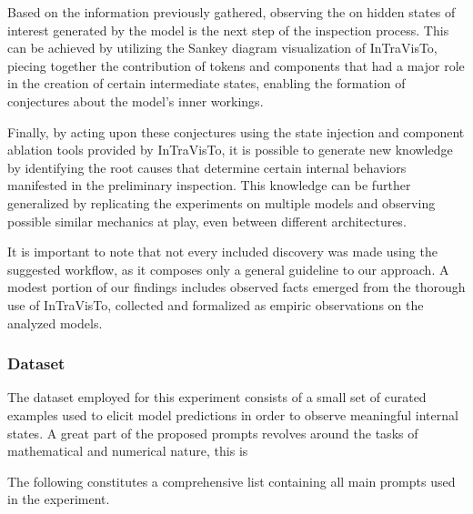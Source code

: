 Based on the information previously gathered, observing the  on hidden states of interest generated by the model is the next step of the inspection process.
This can be achieved by utilizing the Sankey diagram visualization of InTraVisTo, piecing together the contribution of tokens and components that had a major role in the creation of certain intermediate states, enabling the formation of conjectures about the model's inner workings.

Finally, by acting upon these conjectures using the state injection and component ablation tools provided by InTraVisTo, it is possible to generate new knowledge by identifying the root causes that determine certain internal behaviors manifested in the preliminary inspection.
This knowledge can be further generalized by replicating the experiments on multiple models and observing possible similar mechanics at play, even between different architectures.

It is important to note that not every included discovery was made using the suggested workflow, as it composes only a general guideline to our approach.
A modest portion of our findings includes observed facts emerged from the thorough use of InTraVisTo, collected and formalized as empiric observations on the analyzed models.

\subsubsection{Dataset}

The dataset employed for this experiment consists of a small set of curated examples used to elicit model predictions in order to observe meaningful internal states.
A great part of the proposed prompts revolves around the  tasks of mathematical and numerical nature, this is

The following constitutes a comprehensive list containing all main prompts used in the experiment.




